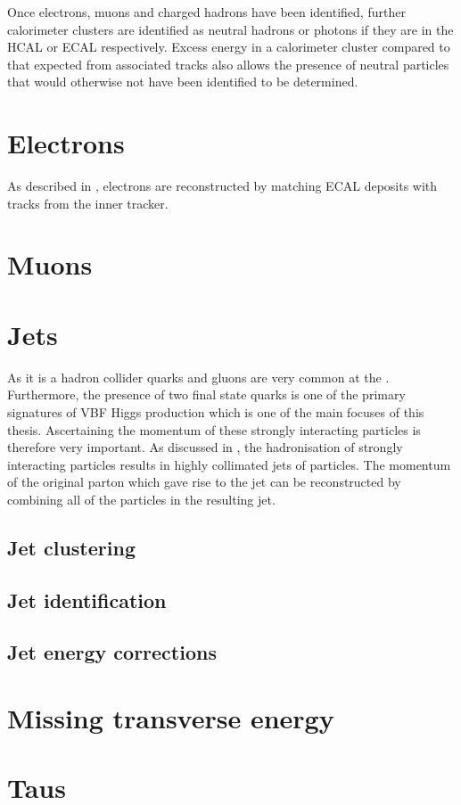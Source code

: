 Once electrons, muons and charged hadrons have been identified, further calorimeter clusters are identified as neutral hadrons or photons if they are in the \ac{HCAL} or \ac{ECAL} respectively. Excess energy in a calorimeter cluster compared to that expected from associated tracks also allows the presence of neutral particles that would otherwise not have been identified to be determined.

\section{Electrons}
\label{sec:electrons}
As described in , electrons are reconstructed by matching \ac{ECAL} deposits with tracks from the inner tracker. 


\section{Muons}
\label{sec:muons}

\section{Jets}
\label{sec:jets}
As it is a hadron collider quarks and gluons are very common at the \LHC. Furthermore, the presence of two final state quarks is one of the primary signatures of \ac{VBF} Higgs production which is one of the main focuses of this thesis. Ascertaining the momentum of these strongly interacting particles is therefore very important. As discussed in , the hadronisation of strongly interacting particles results in highly collimated jets of particles. The momentum of the original parton which gave rise to the jet can be reconstructed by combining all of the particles in the resulting jet.


\subsection{Jet clustering}

\subsection{Jet identification}

\subsection{Jet energy corrections}

\section{Missing transverse energy}
\label{sec:MET}

\section{Taus}
\label{sec:taus}
